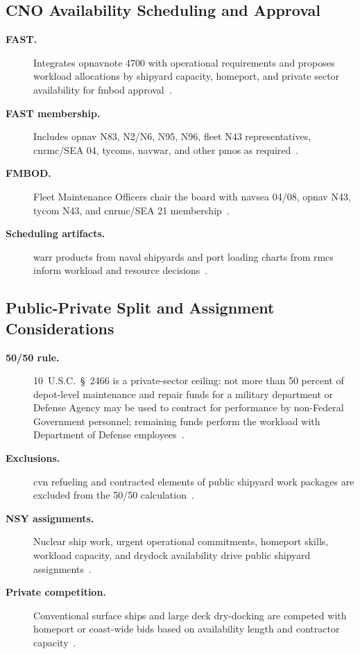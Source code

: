 \documentclass[../main.tex]{subfiles}
\begin{document}
\subsection{CNO Availability Scheduling and Approval}
\begin{description}
  \item[\textbf{FAST.}] Integrates \ac{opnavnote} 4700 with operational requirements and proposes workload allocations by shipyard capacity, homeport, and private sector availability for \ac{fmbod} approval~\autocite{OPNAVINST4700-7N,COMFLTFORCOMINST4790-3,edo-4-1-3-fleet-maint-policy-2025}.
  \item[\textbf{FAST membership.}] Includes \ac{opnav} N83, N2/N6, N95, N96, fleet N43 representatives, \ac{cnrmc}/SEA 04, \ac{tycom}s, \ac{navwar}, and other \acp{pmo} as required~\autocite{edo-4-1-3-fleet-maint-policy-2025}.
  \item[\textbf{FMBOD.}] Fleet Maintenance Officers chair the board with \ac{navsea} 04/08, \ac{opnav} N43, \ac{tycom} N43, and \ac{cnrmc}/SEA 21 membership~\autocite{edo-4-1-3-fleet-maint-policy-2025}.
  \item[\textbf{Scheduling artifacts.}] \ac{warr} products from naval shipyards and port loading charts from \acp{rmc} inform workload and resource decisions~\autocite{edo-4-1-3-fleet-maint-policy-2025}.
\end{description}

\subsection{Public-Private Split and Assignment Considerations}
\begin{description}
  \item[\textbf{50/50 rule.}] 10~U.S.C.~\S~2466 is a private-sector ceiling: not more than 50 percent of depot-level maintenance and repair funds for a military department or Defense Agency may be used to contract for performance by non-Federal Government personnel; remaining funds perform the workload with Department of Defense employees~\autocite{USC-10-2466,edo-4-1-3-fleet-maint-policy-2025}.
  \item[\textbf{Exclusions.}] \ac{cvn} refueling and contracted elements of public shipyard work packages are excluded from the 50/50 calculation~\autocite{edo-4-1-3-fleet-maint-policy-2025}.
  \item[\textbf{NSY assignments.}] Nuclear ship work, urgent operational commitments, homeport skills, workload capacity, and drydock availability drive public shipyard assignments~\autocite{edo-4-1-3-fleet-maint-policy-2025}.
  \item[\textbf{Private competition.}] Conventional surface ships and large deck dry-docking are competed with homeport or coast-wide bids based on availability length and contractor capacity~\autocite{edo-4-1-3-fleet-maint-policy-2025}.
\end{description}
\end{document}
